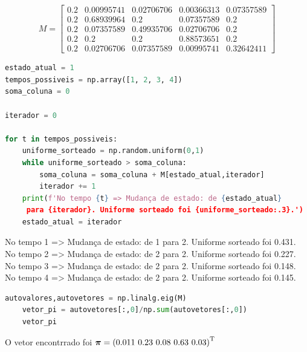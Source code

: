 \documentclass{homeworkclass}
\begin{document}
\begin{homeworkProblem}
\begin{homeworkSection}
\begin{equation*}
M = \begin{bmatrix}
0.2 & 0.00995741 & 0.02706706 & 0.00366313 & 0.07357589\\
0.2 & 0.68939964& 0.2       & 0.07357589 &0.2       \\
0.2 & 0.07357589& 0.49935706& 0.02706706 & 0.2       \\
0.2 & 0.2       & 0.2       & 0.88573651 & 0.2       \\
0.2 & 0.02706706& 0.07357589& 0.00995741 & 0.32642411
\end{bmatrix}
\end{equation*}

\end{homeworkSection}

\begin{homeworkSection}[b) Iniciando em $X(0) = 1$, calcule manualmente 4 amostras do processo X(t).]

\begin{lstlisting}[language=Python]
estado_atual = 1
tempos_possiveis = np.array([1, 2, 3, 4])
soma_coluna = 0

iterador = 0

for t in tempos_possiveis:
	uniforme_sorteado = np.random.uniform(0,1)
	while uniforme_sorteado > soma_coluna:
		soma_coluna = soma_coluna + M[estado_atual,iterador]
		iterador += 1
	print(f'No tempo {t} => Mudança de estado: de {estado_atual}
	 para {iterador}. Uniforme sorteado foi {uniforme_sorteado:.3}.')
	estado_atual = iterador
	\end{lstlisting}

	No tempo 1 => Mudança de estado: de 1 para 2. Uniforme sorteado foi 0.431. \\
	No tempo 2 => Mudança de estado: de 2 para 2. Uniforme sorteado foi 0.227. \\
	No tempo 3 => Mudança de estado: de 2 para 2. Uniforme sorteado foi 0.148. \\
	No tempo 4 => Mudança de estado: de 2 para 2. Uniforme sorteado foi 0.145.
\end{homeworkSection}

\begin{homeworkSection}
\begin{lstlisting}[language=Python]
	autovalores,autovetores = np.linalg.eig(M)
	vetor_pi = autovetores[:,0]/np.sum(autovetores[:,0])
	vetor_pi
\end{lstlisting}
O vetor encontrrado foi $\boldsymbol{\pi} = \left( 0.011 \, \, 0.23 \, \, 0.08 \, \, 0.63 \, \, 0.03 \right)^{\mathrm{T}}$


\end{homeworkSection}
\end{homeworkProblem}
\end{document}
